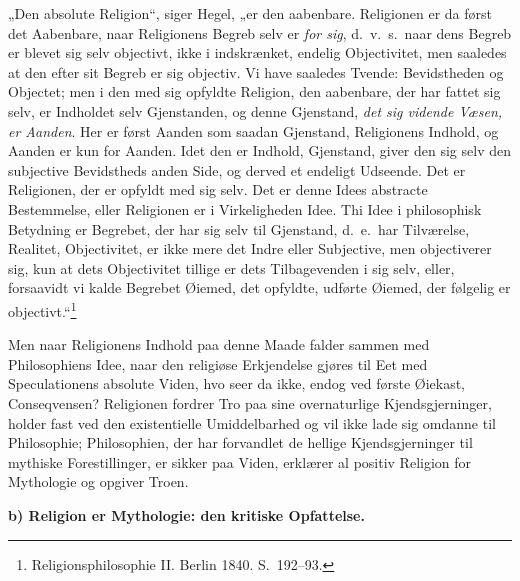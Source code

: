 \documentclass[12pt]{book}
\newcommand{\runhead}[1]{%
  \medskip\begin{center}{\bfseries #1}\end{center}\medskip}
\begin{document}
„Den absolute Religion“, siger Hegel, „er den aabenbare. Religionen
er da først det Aabenbare, naar Religionens Begreb selv er \emph{for
sig}, d.\ v.\ s.\ naar dens Begreb er blevet sig selv objectivt,
ikke i indskrænket, endelig Objectivitet, men saaledes at den efter
sit Begreb er sig objectiv. Vi have saaledes Tvende: Bevidstheden og
Objectet; men i den med sig opfyldte Religion, den aabenbare, der
har fattet sig selv, er Indholdet selv Gjenstanden, og denne
Gjenstand, \emph{det sig vidende Væsen, er Aanden}. Her er først
Aanden som saadan Gjenstand, Religionens Indhold, og Aanden er kun
for Aanden. Idet den er Indhold, Gjenstand, giver den sig selv den
subjective Bevidstheds anden Side, og derved et endeligt Udseende.
Det er Religionen, der er opfyldt med sig selv. Det er denne Idees
abstracte Bestemmelse, eller Religionen er i Virkeligheden Idee. Thi
Idee i philosophisk Betydning er Begrebet, der har sig selv til
Gjenstand, d.\ e.\ har Tilværelse, Realitet, Objectivitet, er ikke
mere det Indre eller Subjective, men objectiverer sig, kun at dets
Objectivitet tillige er dets Tilbagevenden i sig selv, eller,
forsaavidt vi kalde Begrebet Øiemed, det opfyldte, udførte Øiemed,
der følgelig er objectivt.“\footnote{Religionsphilosophie II.
Berlin 1840. S.\ 192--93.}

Men naar Religionens Indhold paa denne Maade falder sammen med
Philosophiens Idee, naar den religiøse Erkjendelse gjøres til Eet
med Speculationens absolute Viden, hvo seer da ikke, endog ved
første Øiekast, Conseqvensen? Religionen fordrer Tro paa sine
overnaturlige Kjendsgjerninger, holder fast ved den existentielle
Umiddelbarhed og vil ikke lade sig omdanne til Philosophie;
Philosophien, der har forvandlet de hellige
Kjendsgjerninger til mythiske Forestillinger, er sikker paa Viden,
erklærer al positiv Religion for Mythologie og opgiver Troen.

\runhead{b) Religion er Mythologie: den kritiske Opfattelse.}
\end{document}
